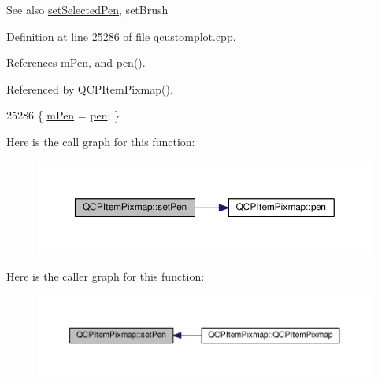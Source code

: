 \begin{DoxySeeAlso}{See also}
\hyperlink{class_q_c_p_item_pixmap_afc5e479e88e53740176ce77cb70dd67a}{set\+Selected\+Pen}, set\+Brush 
\end{DoxySeeAlso}


Definition at line 25286 of file qcustomplot.\+cpp.



References m\+Pen, and pen().



Referenced by Q\+C\+P\+Item\+Pixmap().


\begin{DoxyCode}
25286 \{ \hyperlink{class_q_c_p_item_pixmap_acfee1124eb51a1887aaf8de10777c7a1}{mPen} = \hyperlink{class_q_c_p_item_pixmap_ab2b821c80cfade589472e933b9c4361f}{pen}; \}
\end{DoxyCode}


Here is the call graph for this function\+:\nopagebreak
\begin{figure}[H]
\begin{center}
\leavevmode
\includegraphics[width=350pt]{class_q_c_p_item_pixmap_acdade1305edb4b5cae14f97fd132065f_cgraph}
\end{center}
\end{figure}




Here is the caller graph for this function\+:\nopagebreak
\begin{figure}[H]
\begin{center}
\leavevmode
\includegraphics[width=350pt]{class_q_c_p_item_pixmap_acdade1305edb4b5cae14f97fd132065f_icgraph}
\end{center}
\end{figure}


\hypertarget{class_q_c_p_item_pixmap_a726b69ea4025edf48f9b29b6450548a7}{}
